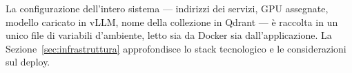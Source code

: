 La configurazione dell'intero sistema --- indirizzi dei servizi, GPU assegnate, modello caricato in vLLM, nome della
collezione in Qdrant --- è raccolta in un unico file di variabili d'ambiente, letto sia da Docker sia
dall'applicazione. La Sezione~\ref{sec:infrastruttura} approfondisce lo stack tecnologico e le considerazioni sul
deploy.
